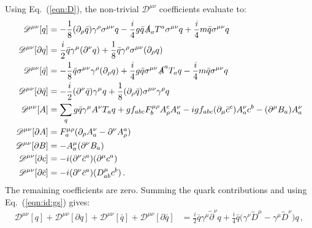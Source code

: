 \documentclass[prd,preprint,
  showpacs,showkeys,lengthcheck,
  nofootinbib,tightenlines,onecolumn,notitlepage,
  preprintnumbers,superscriptaddress]{revtex4-1}
\begin{document}
Using Eq.~(\ref{eqn:D}),
the non-trivial $\mathscr{D}^{\mu\nu}$ coefficients evaluate to:
\begin{subequations}
  \begin{align}
    \mathscr{D}^{\mu\nu}[{q}]
    &=
    -
    \frac{1}{8} (\partial_\rho \bar{q}) \gamma^\rho \sigma^{\mu\nu} {q}
    -
    \frac{i}{4} g \bar{q} \slashed{A}_a T^a \sigma^{\mu\nu} {q}
    +
    \frac{i}{4} m \bar{q} \sigma^{\mu\nu} {q}
    \\
    \mathscr{D}^{\mu\nu}[\partial {q}]
    &=
    \frac{i}{2}
    \bar{q} \gamma^\mu
    (\partial^\nu {q})
    +
    \frac{1}{8}
    \bar{q} \gamma^\rho
    \sigma^{\mu\nu} (\partial_\rho {q})
    \\
    \mathscr{D}^{\mu\nu}[\bar{q}]
    &=
    -
    \frac{1}{8} \bar{q} \sigma^{\mu\nu}
    \gamma^\rho (\partial_\rho {q})
    +
    \frac{i}{4}
    g
    \bar{q} \sigma^{\mu\nu} \slashed{A}^a T_a {q}
    -
    \frac{i}{4}
    m
    \bar{q} \sigma^{\mu\nu} {q}
    \\
    \mathscr{D}^{\mu\nu}[\partial \bar{q}]
    &=
    - \frac{i}{2} (\partial^\nu\bar{q}) \gamma^\mu {q}
    + \frac{1}{8} (\partial_\rho \bar{q}) \sigma^{\mu\nu}
    \gamma^\rho {q}
    \\
    \mathscr{D}^{\mu\nu}[A]
    &=
    \sum_q
    g \bar q \gamma^\mu A^\nu T_a q
    + g f_{abc} F_b^{\mu\rho} A^c_\rho A^\nu_a
    - ig f_{abc} (\partial_\mu \bar{c}^c) A^\nu_a c^b
    -
    (\partial^\mu B_a) A^\nu_a
    \\
    \mathscr{D}^{\mu\nu}[\partial A]
    &=
    F^{\mu\rho}_a
    ( \partial_\rho A^\nu_a - \partial^\nu A_\rho^a )
    \\
    \mathscr{D}^{\mu\nu}[\partial B]
    &=
    -
    A^\mu_a (\partial^\nu B_a)
    \\
    \mathscr{D}^{\mu\nu}[\partial c]
    &=
    -i (\partial^\nu \bar{c}^a) (\partial^\mu c^a)
    \\
    \mathscr{D}^{\mu\nu}[\partial \bar{c}]
    &=
    - i (\partial^\nu \bar{c}^a)(D^\mu_{ab} c^b)
    \,.
  \end{align}
\end{subequations}
The remaining coefficients are zero.
Summing the quark contributions and using Eq.~(\ref{eqn:id:gs}) gives:
\begin{subequations}
  \begin{align}
    \mathscr{D}^{\mu\nu}[ {q} ]
    +
    \mathscr{D}^{\mu\nu}[ \partial{q} ]
    +
    \mathscr{D}^{\mu\nu}[ \bar{q} ]
    +
    \mathscr{D}^{\mu\nu}[ \partial\bar{q} ]
    &=
    \frac{i}{2} \bar q
    \gamma^\mu \overleftrightarrow{\partial}^\nu
    q
    +
    \frac{i}{4}
    \bar q
    \Big(
    \gamma^\nu \overleftrightarrow{D}^\mu
    -
    \gamma^\mu \overleftrightarrow{D}^\nu
    \Big)
    q
    \,,
  \end{align}
\end{subequations}
\end{document}
